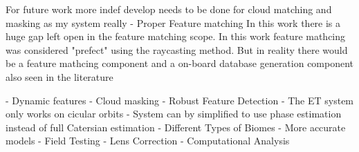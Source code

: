 \label{chap:conclusion}

\label{sec:conclusion}





\label{sec:futurework}

\noindent
For future work more indef develop needs to be done for cloud matching and masking as my system really
- Proper Feature matching
In this work there is a huge gap left open in the feature matching scope. In this work feature mathcing was considered "prefect" using the raycasting method. 
But in reality there would be a feature mathcing component and a on-board database generation component also seen in the literature 


- Dynamic features
- Cloud masking
- Robust Feature Detection
- The ET system only works on cicular orbits
- System can by simplified to use phase estimation instead of full Catersian estimation
- Different Types of Biomes
- More accurate models
- Field Testing
- Lens Correction
- Computational Analysis